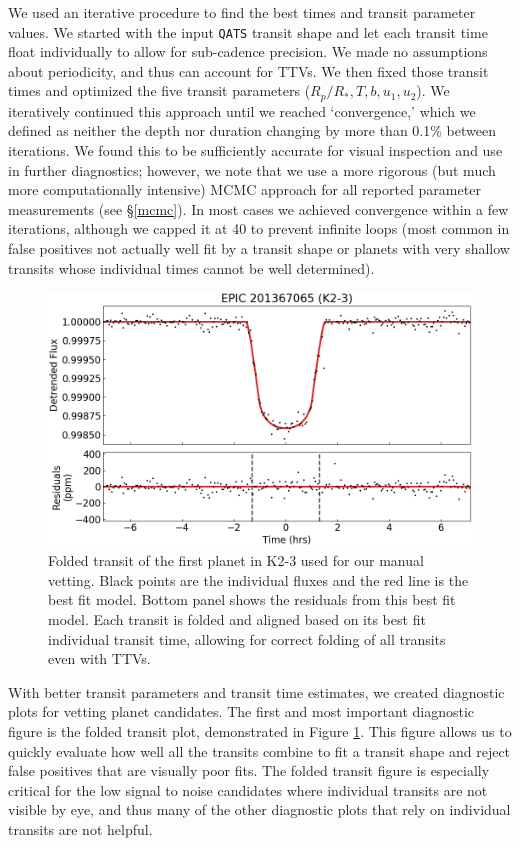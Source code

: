 \documentclass[twocolumn]{aastex62}
\newcommand{\pipeline}[1]{\texttt{#1}}
\begin{document}
We used an iterative procedure to find the best times and transit
parameter values. We started with the input \pipeline{QATS} transit
shape and let each transit time float individually to allow for
sub-cadence precision. We made no assumptions about periodicity, and
thus can account for TTVs. We then fixed those transit times and
optimized the five transit parameters ($R_p/R_*, T, b, u_1, u_2$). We
iteratively continued this approach until we reached `convergence,'
which we defined as neither the depth nor duration changing by more
than 0.1\% between iterations. We found this to be sufficiently
accurate for visual inspection and use in further diagnostics;
however, we note that we use a more rigorous (but much more
computationally intensive) MCMC approach for all reported parameter
measurements (see \S\ref{mcmc}). In most cases we achieved convergence
within a few iterations, although we capped it at 40 to prevent
infinite loops (most common in false positives not actually well fit
by a transit shape or planets with very shallow transits whose
individual times cannot be well determined).

\begin{figure}[tbp]
\includegraphics[width=\columnwidth]{k2-3fold.png}
\caption{Folded transit of the first planet in K2-3 used for our
  manual vetting. Black points are the individual fluxes and the red
  line is the best fit model. Bottom panel shows the residuals from
  this best fit model. Each transit is folded and aligned based on its
  best fit individual transit time, allowing for correct folding of
  all transits even with TTVs. \label{k2-3fold}}
\end{figure}

With better transit parameters and transit time estimates, we created
diagnostic plots for vetting planet candidates. The first and most
important diagnostic figure is the folded transit plot, demonstrated
in Figure \ref{k2-3fold}. This figure allows us to quickly evaluate
how well all the transits combine to fit a transit shape and reject
false positives that are visually poor fits. The folded transit figure
is especially critical for the low signal to noise candidates where
individual transits are not visible by eye, and thus many of the other
diagnostic plots that rely on individual transits are not helpful.
  
\end{document}
